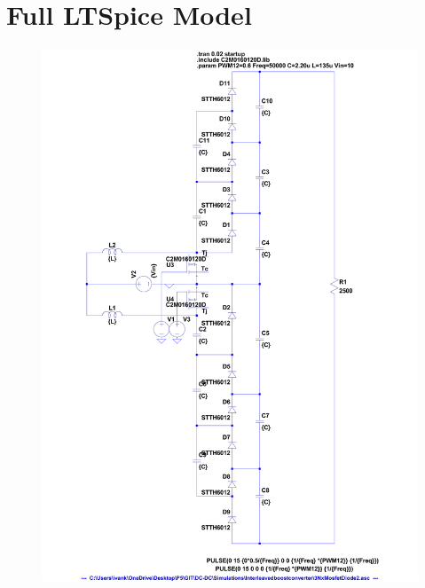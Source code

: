 \chapter{Full LTSpice Model}
\label{app:LTSpice}
\begin{figure}[H]
	\centering
	\includegraphics[height = 0.7\textheight, keepaspectratio]{figures/6Nx_LTSpice.pdf}
\end{figure}